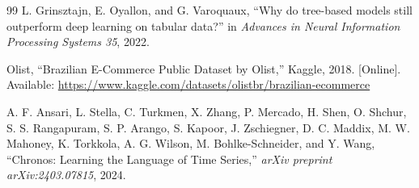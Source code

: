 \documentclass[12pt,a4paper]{report}
\begin{document}
\begin{thebibliography}{99}
L. Grinsztajn, E. Oyallon, and G. Varoquaux, ``Why do tree-based models still outperform deep learning on tabular data?'' in \textit{Advances in Neural Information Processing Systems 35}, 2022.

Olist, ``Brazilian E-Commerce Public Dataset by Olist,'' Kaggle, 2018. [Online]. Available: \url{https://www.kaggle.com/datasets/olistbr/brazilian-ecommerce}

A. F. Ansari, L. Stella, C. Turkmen, X. Zhang, P. Mercado, H. Shen, O. Shchur, S. S. Rangapuram, S. P. Arango, S. Kapoor, J. Zschiegner, D. C. Maddix, M. W. Mahoney, K. Torkkola, A. G. Wilson, M. Bohlke-Schneider, and Y. Wang, ``Chronos: Learning the Language of Time Series,'' \textit{arXiv preprint arXiv:2403.07815}, 2024.

\end{thebibliography}


\end{document}
